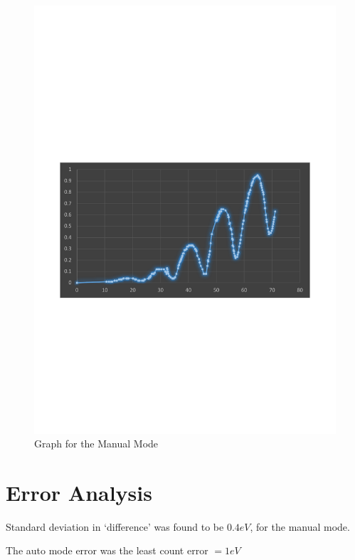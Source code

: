 	\begin{figure}[bth]
		\begin{center}
			\includegraphics[width=1.3\linewidth]{gfx/e2_result.pdf}
		\end{center}
	\caption[Graph for the Manual Mode]{Graph for the Manual Mode}
	\label{e2_result}
	\end{figure}
\section{Error Analysis}
	Standard deviation in `difference' was found to be $0.4 eV$, for the manual mode.
	\par
	The auto mode error was the least count error $=1eV$

